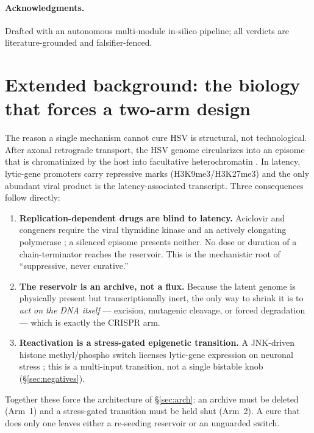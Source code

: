 \documentclass[11pt,a4paper]{article}
\begin{document}
\paragraph{Acknowledgments.}
Drafted with an autonomous multi-module in-silico pipeline; all verdicts are
literature-grounded and falsifier-fenced.

\section{Extended background: the biology that forces a two-arm design}
\label{sec:bio}
The reason a single mechanism cannot cure HSV is structural, not technological.
After axonal retrograde transport, the HSV genome circularizes into an episome
that is chromatinized by the host into facultative heterochromatin
\citep{wilson2012,bloom2016}. In latency, lytic-gene promoters carry repressive
marks (H3K9me3/H3K27me3) and the only abundant viral product is the
latency-associated transcript. Three consequences follow directly:

\begin{enumerate}
\item \textbf{Replication-dependent drugs are blind to latency.} Aciclovir and
congeners require the viral thymidine kinase and an actively elongating
polymerase \citep{elion1977}; a silenced episome presents neither. No dose or
duration of a chain-terminator reaches the reservoir. This is the mechanistic
root of ``suppressive, never curative.''
\item \textbf{The reservoir is an archive, not a flux.} Because the latent
genome is physically present but transcriptionally inert, the only way to shrink
it is to \emph{act on the DNA itself} --- excision, mutagenic cleavage, or
forced degradation --- which is exactly the CRISPR arm.
\item \textbf{Reactivation is a stress-gated epigenetic transition.} A
JNK-driven histone methyl/phospho switch licenses lytic-gene expression on
neuronal stress \citep{cliffe2017}; this is a multi-input transition, not a
single bistable knob (\S\ref{sec:negatives}).
\end{enumerate}

Together these force the architecture of \S\ref{sec:arch}: an archive must be
deleted (Arm~1) and a stress-gated transition must be held shut (Arm~2). A cure
that does only one leaves either a re-seeding reservoir or an unguarded switch.
\end{document}
